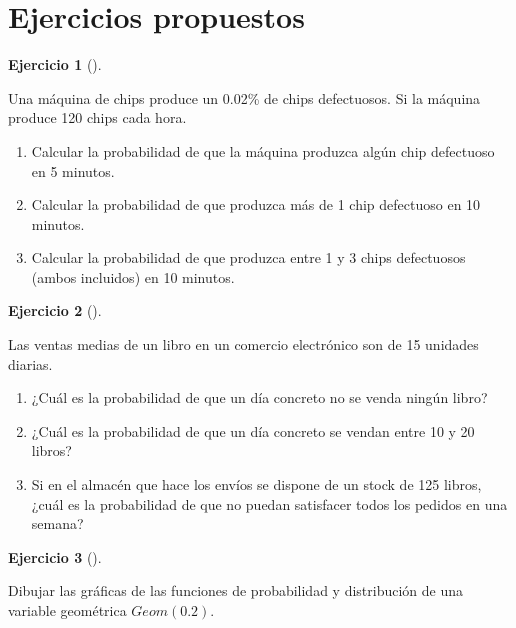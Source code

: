 \documentclass[
  a4paper,
]{scrreport}
\theoremstyle{definition}
\newtheorem{exercise}{Ejercicio}[chapter]
\theoremstyle{remark}
\begin{document}
\section{Ejercicios propuestos}\label{ejercicios-propuestos-5}

\begin{exercise}[]\protect\hypertarget{exr-distribuciones-probabilidad-7}{}\label{exr-distribuciones-probabilidad-7}

Una máquina de chips produce un 0.02\% de chips defectuosos. Si la
máquina produce 120 chips cada hora.

\begin{enumerate}
\def\labelenumi{\alph{enumi}.}
\item
  Calcular la probabilidad de que la máquina produzca algún chip
  defectuoso en 5 minutos.
\item
  Calcular la probabilidad de que produzca más de 1 chip defectuoso en
  10 minutos.
\item
  Calcular la probabilidad de que produzca entre 1 y 3 chips defectuosos
  (ambos incluidos) en 10 minutos.
\end{enumerate}

\end{exercise}

\begin{exercise}[]\protect\hypertarget{exr-distribuciones-probabilidad-8}{}\label{exr-distribuciones-probabilidad-8}

Las ventas medias de un libro en un comercio electrónico son de 15
unidades diarias.

\begin{enumerate}
\def\labelenumi{\alph{enumi}.}
\item
  ¿Cuál es la probabilidad de que un día concreto no se venda ningún
  libro?
\item
  ¿Cuál es la probabilidad de que un día concreto se vendan entre 10 y
  20 libros?
\item
  Si en el almacén que hace los envíos se dispone de un stock de 125
  libros, ¿cuál es la probabilidad de que no puedan satisfacer todos los
  pedidos en una semana?
\end{enumerate}

\end{exercise}

\begin{exercise}[]\protect\hypertarget{exr-distribuciones-probabilidad-9}{}\label{exr-distribuciones-probabilidad-9}

Dibujar las gráficas de las funciones de probabilidad y distribución de
una variable geométrica \(Geom(0.2)\).

\end{exercise}
\end{document}
